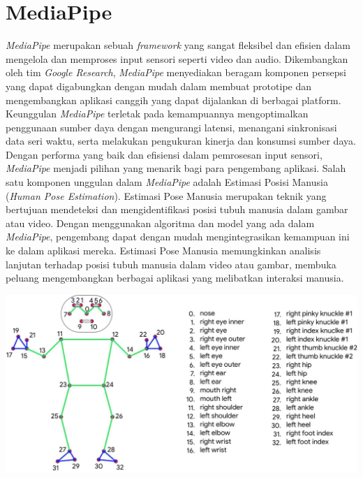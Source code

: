 \section{MediaPipe}
\textit{MediaPipe} merupakan sebuah \textit{framework} yang sangat fleksibel dan efisien dalam mengelola dan memproses input sensori seperti video dan audio. Dikembangkan oleh tim \textit{Google Research}, \textit{MediaPipe} menyediakan beragam komponen persepsi yang dapat digabungkan dengan mudah dalam membuat prototipe dan mengembangkan aplikasi canggih yang dapat dijalankan di berbagai platform. Keunggulan \textit{MediaPipe} terletak pada kemampuannya mengoptimalkan penggunaan sumber daya dengan mengurangi latensi, menangani sinkronisasi data seri waktu, serta melakukan pengukuran kinerja dan konsumsi sumber daya. Dengan performa yang baik dan efisiensi dalam pemrosesan input sensori, \textit{MediaPipe} menjadi pilihan yang menarik bagi para pengembang aplikasi. Salah satu komponen unggulan dalam \textit{MediaPipe} adalah Estimasi Posisi Manusia (\textit{Human Pose Estimation}). Estimasi Pose Manusia merupakan teknik yang bertujuan mendeteksi dan mengidentifikasi posisi tubuh manusia dalam gambar atau video. Dengan menggunakan algoritma dan model yang ada dalam \textit{MediaPipe}, pengembang dapat dengan mudah mengintegrasikan kemampuan ini ke dalam aplikasi mereka. Estimasi Pose Manusia memungkinkan analisis lanjutan terhadap posisi tubuh manusia dalam video atau gambar, membuka peluang mengembangkan berbagai aplikasi yang melibatkan interaksi manusia. \cite{lugaresi2019mediapipe}
\begin{center}
  \includegraphics[width=0.7\linewidth]{gambar/humanpose.jpg}
  \label{fig:Pose Tubuh dari MediaPipe}
\end{center}
